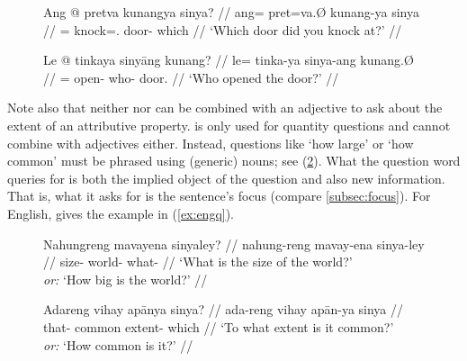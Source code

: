 \begin{figure}[h]
\pex
\a\label{ex:sinyaadj}%
\begingl
	\gla Ang @ pretva kunangya sinya? //
	\glb ang= pret=va.Ø kunang-ya sinya //
	\glc \AgtT{}= knock=\Second{}.\Top{} door-\Loc{} which //
	\glft `Which door did you knock at?' //
\endgl

\a\label{ex:sinyapro}%
\begingl
	\gla Le @ tinkaya sinyāng kunang? //
	\glb le= tinka-ya sinya-ang kunang.Ø //
	\glc \PatTI{}= open-\TsgM{} who-\Aarg{} door.\Top{} //
	\glft `Who opened the door?' //
\endgl
\xe
\end{figure}

Note also that neither  nor
 can be combined with an adjective to
ask about the extent of an attributive property.  is only used for quantity questions and cannot combine with
adjectives either. Instead, questions like `how large' or `how common' must be
phrased using (generic) nouns; see (\ref{ex:hownoun}). What the question word
queries for is both the implied object of the question and also new
information. That is, what it asks for is the sentence's focus (compare
\autoref{subsec:focus}). For English, \citet{dalrymple2001} gives the example
in (\ref{ex:engq}).

\begin{figure}[h]
\pex\label{ex:hownoun}
\a\begingl
	\gla Nahungreng mavayena sinyaley? //
	\glb nahung-reng mavay-ena sinya-ley //
	\glc size-\AargI{} world-\Gen{} what-\PargI{} //
	\glft `What is the size of the world?' \\
		\textit{or:} `How big is the world?' //
\endgl

\a\begingl
	\gla Adareng vihay apānya sinya? //
	\glb ada-reng vihay apān-ya sinya //
	\glc that-\PargI{} common extent-\Loc{} which //
	\glft `To what extent is it common?' \\
		\textit{or:} `How common is it?' //
\endgl
\xe
\end{figure}


